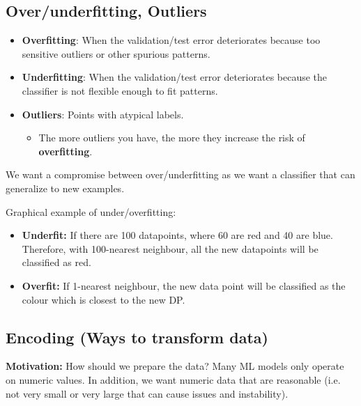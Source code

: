 \subsection{Over/underfitting, Outliers}
\begin{definition}
    \begin{itemize}
        \item \textbf{Overfitting}: When the validation/test error deteriorates because too sensitive outliers or other spurious patterns.

        \item \textbf{Underfitting}: When the validation/test error deteriorates because the classifier is not flexible enough to fit patterns.
        
        \item \textbf{Outliers}: Points with atypical labels. 
        \begin{itemize}
            \item The more outliers you have, the more they increase the risk of \textbf{overfitting}.
        \end{itemize}
    \end{itemize}
\end{definition}

\begin{intuition}
    We want a compromise between over/underfitting as we want a classifier that can generalize to new examples.
\end{intuition}

\begin{example}
    Graphical example of under/overfitting:
    \begin{itemize}
        \item \textbf{Underfit:} If there are 100 datapoints, where 60 are red and 40 are blue. Therefore, with 100-nearest neighbour, all the new datapoints will be classified as red.
        \item \textbf{Overfit:} If 1-nearest neighbour, the new data point will be classified as the colour which is closest to the new DP.
    \end{itemize}
\end{example}

\subsection{Encoding (Ways to transform data)}
\textbf{Motivation:} How should we prepare the data? Many ML models only operate on numeric values. In addition, we want numeric data that are reasonable (i.e. not very small or very large that can cause issues and instability).
